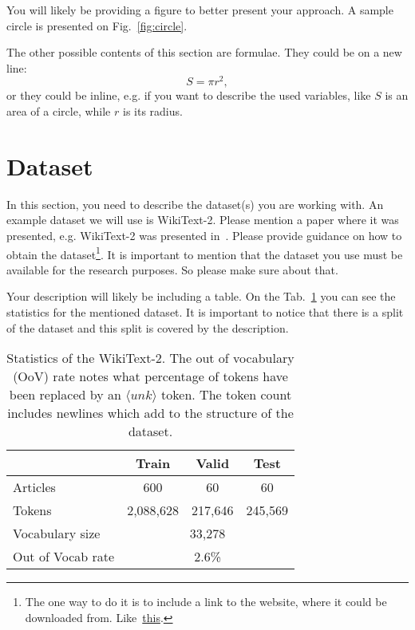 \documentclass{article}
\begin{document}
You will likely be providing a figure to better present your approach. A sample circle is presented on Fig.~\ref{fig:circle}.

The other possible contents of this section are formulae. They could be on a new line:
$$S=\pi r^2,$$
or they could be inline, e.g. if you want to describe the used variables, like $S$ is an area of a circle, while $r$ is its radius.



\section{Dataset}
In this section, you need to describe the dataset(s) you are working with.
An example dataset we will use is WikiText-2. Please mention a paper where it was presented, e.g. WikiText-2 was presented in~\cite{merity2017pointer}. Please provide guidance on how to obtain the dataset\footnote{The one way to do it is to include a link to the website, where it could be downloaded from. Like~\href{https://blog.einstein.ai/the-wikitext-long-term-dependency-language-modeling-dataset/}{this}.}. It is important to mention that the dataset you use must be available for the research purposes. So please make sure about that.

Your description will likely be including a table. On the Tab.~\ref{tab:statistics} you can see the statistics for the mentioned dataset. It is important to notice that there is a split of the dataset and this split is covered by the description.

\begin{table}[tbh!]
\begin{center}
\begin{tabular}[t]{|l|ccc|}
\hline
 & Train & Valid & Test \\
\hline
Articles & 600 & 60 & 60  \\
Tokens& 2,088,628 & 217,646 & 245,569 \\
Vocabulary size & \multicolumn{3}{c|}{33,278} \\
Out of Vocab rate &  \multicolumn{3}{c|}{2.6\%}  \\
\hline
\end{tabular}
\caption{Statistics of the WikiText-2. The out of vocabulary (OoV) rate notes what percentage of tokens have been replaced by an $\langle unk \rangle$ token. The token count includes newlines which add to the structure of the dataset.}
\label{tab:statistics}
\end{center}
\end{table}
\end{document}
